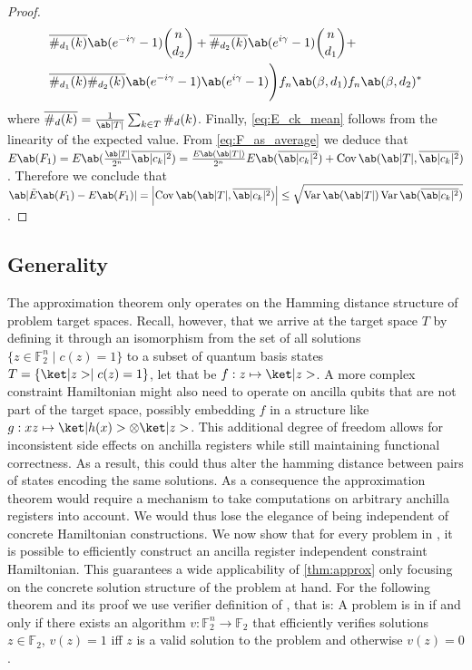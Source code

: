 \begin{proof}
\begin{align*}
        &\overline{\#_{d_1} (k)} \ab(e^{-i \pangle} - 1) \binom{n}{d_2} + \overline{\#_{d_2} (k)} \ab(e^{i \pangle} - 1) \binom{n}{d_1} + \\
        &\overline{\#_{d_1} (k) \#_{d_2} (k)} \ab(e^{-i \pangle} - 1) \ab(e^{i \pangle} - 1) \Bigg)  f_n \ab(\mangle, d_1) f_n \ab(\mangle, d_2)^*
    \end{align*}
    where $\overline{\#_d (k)} = \frac{1}{\ab|T|} \sum_{k \in T} \#_d (k)$. Finally, \cref{eq:E_ck_mean} follows from the linearity of the expected value. From \cref{eq:F_as_average} we deduce that $E\ab(F_1) = E \ab(\frac{\ab|T|}{2^n} \overline{\ab|c_k|^2}) = \frac{E\ab(\ab|T|)}{2^n} E\ab(\overline{\ab|c_k|^2}) + \Cov\ab(\ab|T|, \overline{\ab|c_k|^2})$. Therefore we conclude that $\ab|\tilde{E}\ab(F_1) - E\ab(F_1)| = \left|\Cov\ab(\ab|T|, \overline{\ab|c_k|^2})\right| \leq \sqrt{\Var\ab(\ab|T|) \Var\ab(\overline{\ab|c_k|^2})}$.
\end{proof}

\subsection{Generality}

The approximation theorem only operates on the Hamming distance structure of problem target spaces. Recall, however, that we arrive at the target space $T$ by defining it through an isomorphism from the set of all solutions $\{z \in \mathds{F}_2^n \mid c(z) = 1\}$ to a subset of quantum basis states $T = \{\ket|z> \mid c(z) = 1\}$, let that be $f: z \mapsto \ket|z>$. A more complex constraint Hamiltonian might also need to operate on ancilla qubits that are not part of the target space, possibly embedding $f$ in a structure like $g: xz \mapsto \ket|h(x)> \otimes \ket|z>$. This additional degree of freedom allows for inconsistent side effects on anchilla registers while still maintaining functional correctness. As a result, this could thus alter the hamming distance between pairs of states encoding the same solutions. As a consequence the approximation theorem would require a mechanism to take computations on arbitrary anchilla registers into account. We would thus lose the elegance of being independent of concrete Hamiltonian constructions. We now show that for every problem in \NP, it is possible to efficiently construct an ancilla register independent constraint Hamiltonian. This guarantees a wide applicability of \cref{thm:approx} only focusing on the concrete solution structure of the problem at hand. For the following theorem and its proof we use verifier definition of \NP, that is: A problem is in \NP if and only if there exists an algorithm $v: \mathds{F}_2^n \to \mathds{F}_2$ that efficiently verifies solutions $z \in \mathds{F}_2$, \ie $v(z) = 1$ iff $z$ is a valid solution to the problem and otherwise $v(z) = 0$.

